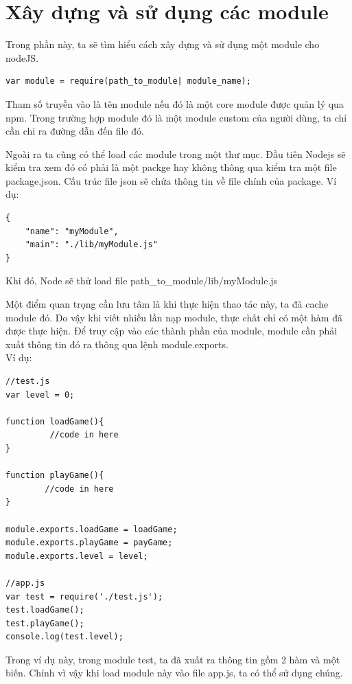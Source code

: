 \documentclass[a4paper,12pt]{report}
\begin{document}
	\section{Xây dựng và sử dụng các module}
	Trong phần này, ta sẽ tìm hiểu cách xây dựng và sử dụng một module cho nodeJS.

			\begin{verbatim}
var module = require(path_to_module| module_name);
			\end{verbatim}
			
	Tham số truyền vào là tên module nếu đó là một core module được quản lý qua npm. Trong trường hợp module đó là một module custom của người dùng, ta chỉ cần chi ra đường dẫn đến file đó. 

	Ngoài ra ta cũng có thể load các module trong một thư mục. Đầu tiên Nodejs sẽ kiểm tra xem đó có phải là một packge hay không thông qua kiểm tra một file package.json. Cấu trúc file json sẽ chứa thông tin về file chính của package. Ví dụ:
			
			\begin{verbatim}
{
	"name": "myModule",
	"main": "./lib/myModule.js"	
}			
			\end{verbatim}
	
	Khi đó, Node sẽ thử load file path\_to\_module/lib/myModule.js
	
	Một điểm quan trọng cần lưu tâm là khi thực hiện thao tác này, ta đã cache module đó. Do vậy khi viết nhiều lần nạp module, thực chất chỉ có một hàm đã được thực hiện.
	Để truy cập vào các thành phần của module, module cần phải xuất thông tin đó ra thông qua lệnh module.exports.\\
		Ví dụ: 	
		
		\begin{verbatim}
//test.js
var level = 0;

function loadGame(){
         //code in here
}

function playGame(){
        //code in here
}

module.exports.loadGame = loadGame;
module.exports.playGame = payGame;
module.exports.level = level;

//app.js
var test = require('./test.js');
test.loadGame();
test.playGame();
console.log(test.level);
		\end{verbatim}
		
		Trong ví dụ này, trong module test, ta đã xuất ra thông tin gồm 2 hàm và một biến. Chính vì vậy khi load module này vào file app.js, ta có thể sử dụng chúng.
\end{document}
